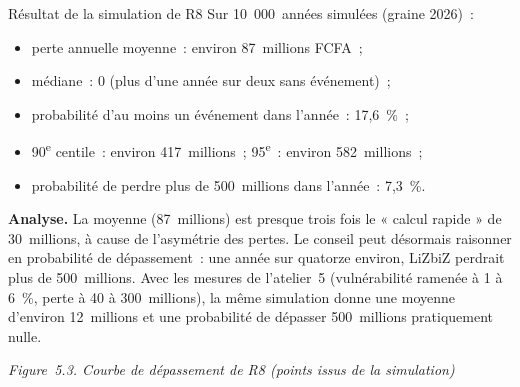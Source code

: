 \begin{boxlecture}{Résultat de la simulation de R8}
Sur 10~000~années simulées (graine 2026)~:
\begin{itemize}
    \item perte annuelle moyenne~: environ 87~millions FCFA~;
    \item médiane~: 0 (plus d'une année sur deux sans événement)~;
    \item probabilité d'au moins un événement dans l'année~: 17,6~\%~;
    \item 90\textsuperscript{e} centile~: environ 417~millions~;
          95\textsuperscript{e}~: environ 582~millions~;
    \item probabilité de perdre plus de 500~millions dans l'année~: 7,3~\%.
\end{itemize}

\textbf{Analyse.} La moyenne (87~millions) est presque trois fois le
« calcul rapide » de 30~millions, à cause de l'asymétrie des pertes. Le
conseil peut désormais raisonner en probabilité de dépassement~: une
année sur quatorze environ, LiZbiZ perdrait plus de 500~millions. Avec les
mesures de l'atelier~5 (vulnérabilité ramenée à 1 à 6~\%, perte à 40 à
300~millions), la même simulation donne une moyenne d'environ
12~millions et une probabilité de dépasser 500~millions pratiquement nulle.
\end{boxlecture}

\noindent\begin{minipage}{\linewidth}
\begin{center}
\end{center}
\vspace{-0.4em}
\begin{center}{\small\itshape Figure~5.3. Courbe de dépassement de R8
(points issus de la simulation)}\end{center}
\end{minipage}

